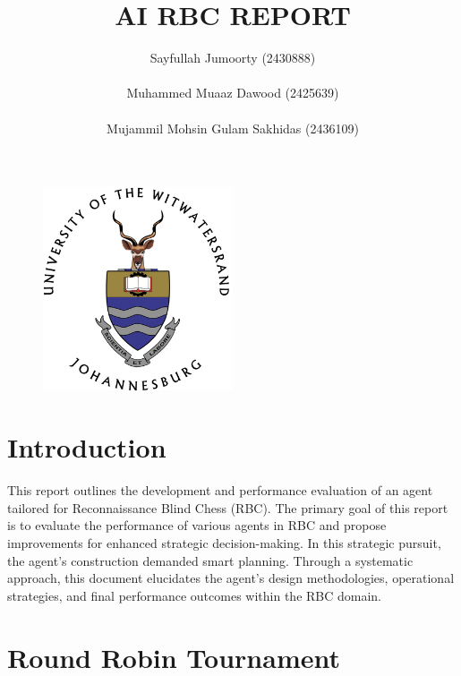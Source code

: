 \documentclass[10pt]{article}
\begin{document}
\title{AI RBC REPORT \\ 
}
\author{Sayfullah Jumoorty (2430888) \\ \\ Muhammed Muaaz Dawood (2425639) \\ \\ Mujammil Mohsin Gulam Sakhidas (2436109)}
\maketitle 
\pagestyle{fancy}
\fancyhf{}
\fancyhead[R]{\thepage}

\begin{figure}[H]
\centering
\includegraphics[width=0.5\textwidth]{logo-round.png}
\label{fig:LOGO}
\end{figure}

\newpage

\tableofcontents

\newpage

\section{Introduction}

This report outlines the development and performance evaluation of an agent tailored for Reconnaissance Blind Chess (RBC). The primary goal of this report is to evaluate the performance of various agents in RBC and propose improvements for enhanced strategic decision-making. In this strategic pursuit, the agent's construction demanded smart planning. Through a systematic approach, this document elucidates the agent's design methodologies, operational strategies, and final performance outcomes within the RBC domain.

\section{Round Robin Tournament}
\end{document}
